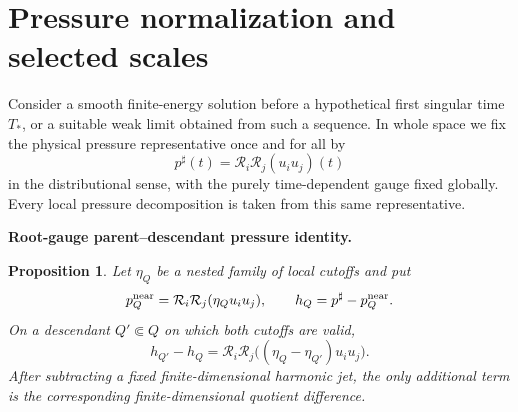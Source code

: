\documentclass[11pt]{article}
\newtheorem{proposition}[theorem]{Proposition}
\theoremstyle{definition}\newtheorem{problem}[theorem]{Problem}
\theoremstyle{definition}
\theoremstyle{remark}
\begin{document}
\section{Pressure normalization and selected scales}

Consider a smooth finite-energy solution before a hypothetical first singular
time \(T_*\), or a suitable weak limit obtained from such a sequence.  In
whole space we fix the physical pressure representative once and for all by
\[
  p^\sharp(t)=\mathcal R_i\mathcal R_j(u_i u_j)(t)
\]
in the distributional sense, with the purely time-dependent gauge fixed
globally.  Every local pressure decomposition is taken from this same
representative.

\medskip
\noindent\textbf{Root-gauge parent--descendant pressure identity.}
\begin{proposition}
Let \(\eta_Q\) be a nested family of local cutoffs and put
\[
  p_Q^{\rm near}=\mathcal R_i\mathcal R_j(\eta_Q u_i u_j),
  \qquad
  h_Q=p^\sharp-p_Q^{\rm near}.
\]
On a descendant \(Q'\Subset Q\) on which both cutoffs are valid,
\[
  h_{Q'}-h_Q
  =
  \mathcal R_i\mathcal R_j\bigl((\eta_Q-\eta_{Q'})u_i u_j\bigr).
\]
After subtracting a fixed finite-dimensional harmonic jet, the only additional
term is the corresponding finite-dimensional quotient difference.
\end{proposition}
\end{document}
